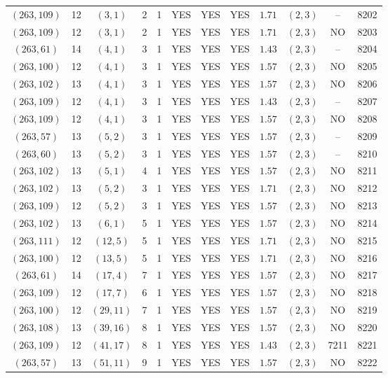 \begin{longtable}{|c|c|c|c|c|c|c|c|c|c|c|c|}
$(263,109)$ & 12 & $(3,1)$ & 2 & 1 & YES & YES & YES & $1.71$ & $(2,3)$ & -- & 8202\\
$(263,109)$ & 12 & $(3,1)$ & 2 & 1 & YES & YES & YES & $1.71$ & $(2,3)$ & NO & 8203\\
$(263,61)$ & 14 & $(4,1)$ & 3 & 1 & YES & YES & YES & $1.43$ & $(2,3)$ & -- & 8204\\
$(263,100)$ & 12 & $(4,1)$ & 3 & 1 & YES & YES & YES & $1.57$ & $(2,3)$ & NO & 8205\\
$(263,102)$ & 13 & $(4,1)$ & 3 & 1 & YES & YES & YES & $1.57$ & $(2,3)$ & NO & 8206\\
$(263,109)$ & 12 & $(4,1)$ & 3 & 1 & YES & YES & YES & $1.43$ & $(2,3)$ & -- & 8207\\
$(263,109)$ & 12 & $(4,1)$ & 3 & 1 & YES & YES & YES & $1.57$ & $(2,3)$ & NO & 8208\\
$(263,57)$ & 13 & $(5,2)$ & 3 & 1 & YES & YES & YES & $1.57$ & $(2,3)$ & -- & 8209\\
$(263,60)$ & 13 & $(5,2)$ & 3 & 1 & YES & YES & YES & $1.57$ & $(2,3)$ & -- & 8210\\
$(263,102)$ & 13 & $(5,1)$ & 4 & 1 & YES & YES & YES & $1.57$ & $(2,3)$ & NO & 8211\\
$(263,102)$ & 13 & $(5,2)$ & 3 & 1 & YES & YES & YES & $1.71$ & $(2,3)$ & NO & 8212\\
$(263,109)$ & 12 & $(5,2)$ & 3 & 1 & YES & YES & YES & $1.57$ & $(2,3)$ & NO & 8213\\
$(263,102)$ & 13 & $(6,1)$ & 5 & 1 & YES & YES & YES & $1.57$ & $(2,3)$ & NO & 8214\\
$(263,111)$ & 12 & $(12,5)$ & 5 & 1 & YES & YES & YES & $1.71$ & $(2,3)$ & NO & 8215\\
$(263,100)$ & 12 & $(13,5)$ & 5 & 1 & YES & YES & YES & $1.71$ & $(2,3)$ & NO & 8216\\
$(263,61)$ & 14 & $(17,4)$ & 7 & 1 & YES & YES & YES & $1.57$ & $(2,3)$ & NO & 8217\\
$(263,109)$ & 12 & $(17,7)$ & 6 & 1 & YES & YES & YES & $1.57$ & $(2,3)$ & NO & 8218\\
$(263,100)$ & 12 & $(29,11)$ & 7 & 1 & YES & YES & YES & $1.57$ & $(2,3)$ & NO & 8219\\
$(263,108)$ & 13 & $(39,16)$ & 8 & 1 & YES & YES & YES & $1.57$ & $(2,3)$ & NO & 8220\\
$(263,109)$ & 12 & $(41,17)$ & 8 & 1 & YES & YES & YES & $1.43$ & $(2,3)$ & 7211 & 8221\\
$(263,57)$ & 13 & $(51,11)$ & 9 & 1 & YES & YES & YES & $1.57$ & $(2,3)$ & NO & 8222\\

\end{longtable}
